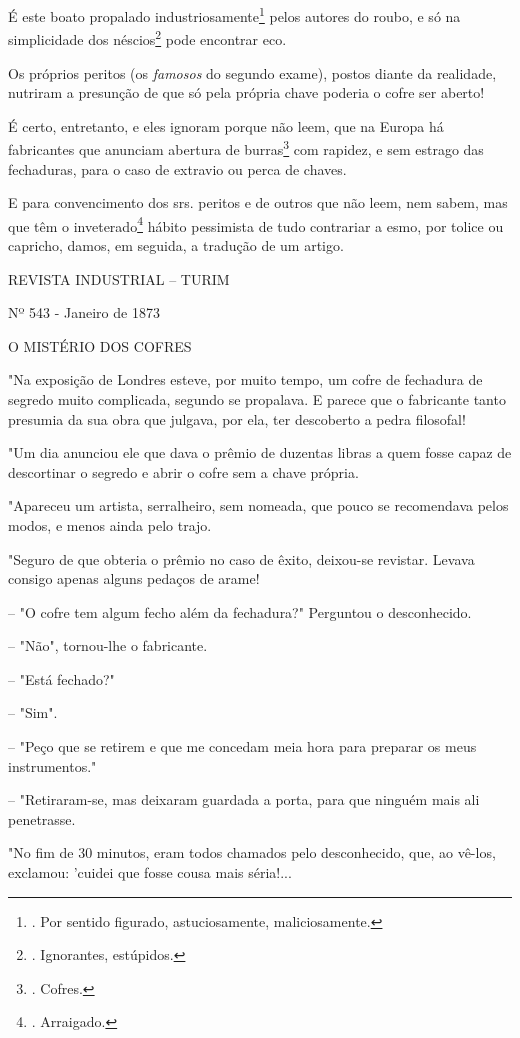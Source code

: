 É este boato propalado industriosamente\footnote{. Por sentido figurado,
  astuciosamente, maliciosamente.} pelos autores do roubo, e só na
simplicidade dos néscios\footnote{. Ignorantes, estúpidos.} pode
encontrar eco.

Os próprios peritos (os \emph{famosos} do segundo exame), postos diante
da realidade, nutriram a presunção de que só pela própria chave poderia
o cofre ser aberto!

É certo, entretanto, e eles ignoram porque não leem, que na Europa há
fabricantes que anunciam abertura de burras\footnote{. Cofres.} com
rapidez, e sem estrago das fechaduras, para o caso de extravio ou perca
de chaves.

E para convencimento dos srs. peritos e de outros que não leem, nem
sabem, mas que têm o inveterado\footnote{. Arraigado.} hábito pessimista
de tudo contrariar a esmo, por tolice ou capricho, damos, em seguida, a
tradução de um artigo.

REVISTA INDUSTRIAL -- TURIM

Nº 543 - Janeiro de 1873

O MISTÉRIO DOS COFRES

"Na exposição de Londres esteve, por muito tempo, um cofre de fechadura
de segredo muito complicada, segundo se propalava. E parece que o
fabricante tanto presumia da sua obra que julgava, por ela, ter
descoberto a pedra filosofal!

"Um dia anunciou ele que dava o prêmio de duzentas libras a quem fosse
capaz de descortinar o segredo e abrir o cofre sem a chave própria.

"Apareceu um artista, serralheiro, sem nomeada, que pouco se recomendava
pelos modos, e menos ainda pelo trajo.

"Seguro de que obteria o prêmio no caso de êxito, deixou-se revistar.
Levava consigo apenas alguns pedaços de arame!

-- "O cofre tem algum fecho além da fechadura?" Perguntou o
desconhecido.

-- "Não", tornou-lhe o fabricante.

-- "Está fechado?"

-- "Sim".

-- "Peço que se retirem e que me concedam meia hora para preparar os
meus instrumentos."

-- "Retiraram-se, mas deixaram guardada a porta, para que ninguém mais
ali penetrasse.

"No fim de 30 minutos, eram todos chamados pelo desconhecido, que, ao
vê-los, exclamou: 'cuidei que fosse cousa mais séria!...

